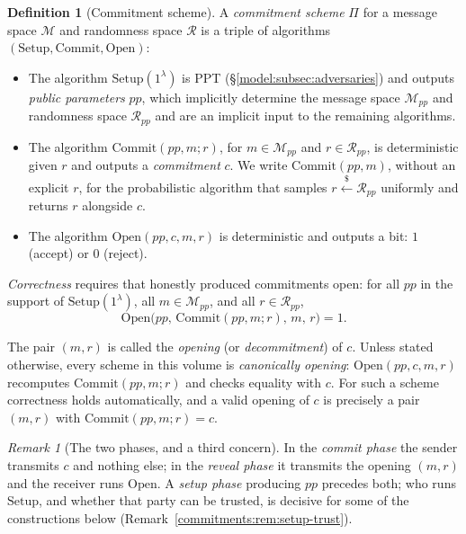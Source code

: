 \documentclass[11pt,a4paper]{article}
\theoremstyle{definition}
\newtheorem{definition}[theorem]{Definition}
\theoremstyle{remark}
\newtheorem{remark}[theorem]{Remark}
\begin{document}
\begin{definition}[Commitment scheme]\label{commitments:def:scheme}
A \emph{commitment scheme} \(\Pi\) for a message space \(\mathcal M\)
and randomness space \(\mathcal R\) is a triple of algorithms
\((\mathrm{Setup}, \mathrm{Commit}, \mathrm{Open})\):
\begin{itemize}
\item The algorithm \(\mathrm{Setup}(1^\lambda)\) is PPT
  (\S\ref{model:subsec:adversaries}) and outputs \emph{public
  parameters} \(pp\), which implicitly determine the message space
  \(\mathcal M_{pp}\) and randomness space \(\mathcal R_{pp}\) and are
  an implicit input to the remaining algorithms.
\item The algorithm \(\mathrm{Commit}(pp, m; r)\), for
  \(m \in \mathcal M_{pp}\) and \(r \in \mathcal R_{pp}\), is
  deterministic given \(r\) and outputs a \emph{commitment} \(c\). We
  write \(\mathrm{Commit}(pp, m)\), without an explicit \(r\), for
  the probabilistic algorithm that samples
  \(r \xleftarrow{\$} \mathcal R_{pp}\) uniformly and returns \(r\)
  alongside \(c\).
\item The algorithm \(\mathrm{Open}(pp, c, m, r)\) is deterministic
  and outputs a bit: \(1\) (accept) or \(0\) (reject).
\end{itemize}
\emph{Correctness} requires that honestly produced commitments open:
for all \(pp\) in the support of \(\mathrm{Setup}(1^\lambda)\), all
\(m \in \mathcal M_{pp}\), and all \(r \in \mathcal R_{pp}\),
\[
\mathrm{Open}\bigl(pp,\, \mathrm{Commit}(pp, m; r),\, m,\, r\bigr)
  = 1 .
\]
\end{definition}

The pair \((m, r)\) is called the \emph{opening} (or
\emph{decommitment}) of \(c\). Unless stated otherwise, every scheme in
this volume is \emph{canonically opening}: \(\mathrm{Open}(pp, c, m, r)\)
recomputes \(\mathrm{Commit}(pp, m; r)\) and checks equality with
\(c\). For such a scheme correctness holds automatically, and a valid
opening of \(c\) is precisely a pair \((m, r)\) with
\(\mathrm{Commit}(pp, m; r) = c\).

\begin{remark}[The two phases, and a third concern]
\label{commitments:rem:phases}
In the \emph{commit phase} the sender transmits \(c\) and nothing else;
in the \emph{reveal phase} it transmits the opening \((m, r)\) and the
receiver runs \(\mathrm{Open}\). A \emph{setup phase} producing \(pp\)
precedes both; who runs \(\mathrm{Setup}\), and whether that party can
be trusted, is decisive for some of the constructions below
(Remark~\ref{commitments:rem:setup-trust}).
\end{remark}
\end{document}
